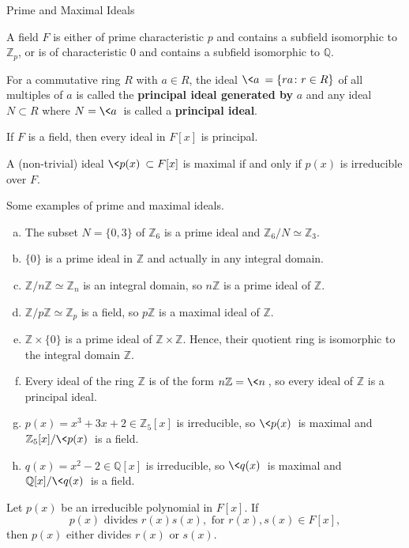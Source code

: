 \begin{section}{Prime and Maximal Ideals}
\begin{thm}
A field $F$ is either of prime characteristic $p$ and contains a subfield isomorphic to $\mathbb{Z}_{p}$, or is of characteristic $0$ and contains a subfield isomorphic to $\mathbb{Q}$.
\end{thm}

\begin{defn}
For a commutative ring $R$ with $a \in R$, the ideal $\<a\> = \{ra \colon r \in R\}$ of all multiples of $a$ is called the {\bf principal ideal generated by} $a$ and any ideal $N \subset R$ where $N = \<a\>$ is called a {\bf principal ideal}.  
\end{defn}

\begin{defn}
If $F$ is a field, then every ideal in $F[x]$ is principal.
\end{defn}

\begin{prop}
A (non-trivial) ideal $\<p(x)\> \subset F[x]$ is maximal if and only if $p(x)$ is irreducible over $F$.
\end{prop}

\begin{ex}
Some examples of prime and maximal ideals.
\begin{enumerate}[(a)]
\item The subset $N = \{0,3\}$ of $\mathbb{Z}_{6}$ is a prime ideal and $\mathbb{Z}_{6}/N \simeq \mathbb{Z}_{3}$.
\item $\{0\}$ is a prime ideal in $\mathbb{Z}$ and actually in any integral domain.
\item $\mathbb{Z}/n\mathbb{Z} \simeq \mathbb{Z}_{n}$ is an integral domain, so $n\mathbb{Z}$ is a prime ideal of $\mathbb{Z}$.
\item $\mathbb{Z}/p\mathbb{Z} \simeq \mathbb{Z}_{p}$ is a field, so $p\mathbb{Z}$ is a maximal ideal of $\mathbb{Z}$.
\item $\mathbb{Z} \times \{0\}$ is a prime ideal of $\mathbb{Z} \times \mathbb{Z}$. Hence, their quotient ring is isomorphic to the integral domain $\mathbb{Z}$.
\item Every ideal of the ring $\mathbb{Z}$ is of the form $n\mathbb{Z} = \<n\>$, so every ideal of $\mathbb{Z}$ is a principal ideal.
\item $p(x) = x^{3} + 3x + 2 \in \mathbb{Z}_{5}[x]$ is irreducible, so $\<p(x)\>$ is maximal and $\mathbb{Z}_{5}[x]/\<p(x)\>$ is a field. 
\item $q(x) = x^{2} - 2 \in \mathbb{Q}[x]$ is irreducible, so $\<q(x)\>$ is maximal and $\mathbb{Q}[x]/\<q(x)\>$ is a field.
\end{enumerate}
\end{ex}

\begin{thm}
Let $p(x)$ be an irreducible polynomial in $F[x]$. If $$p(x) \textrm{ divides } r(x)s(x), \textrm{ for } r(x),s(x) \in F[x],$$ then $p(x)$ either divides $r(x)$ or $s(x)$.
\end{thm}

\end{section}
